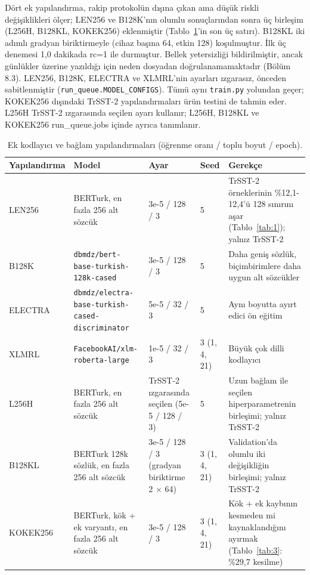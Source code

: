 \documentclass[11pt]{article}
\begin{document}
Dört ek yapılandırma, rakip protokolün dışına çıkan ama düşük riskli değişiklikleri ölçer; LEN256 ve B128K'nın olumlu sonuçlarından sonra üç birleşim (L256H, B128KL, KOKEK256) eklenmiştir (Tablo~\ref{tab:5}'in son üç satırı). B128KL iki adımlı gradyan biriktirmeyle (cihaz başına 64, etkin 128) koşulmuştur. İlk üç denemesi 1,0 dakikada rc=1 ile durmuştur. Bellek yetersizliği bildirilmiştir, ancak günlükler üzerine yazıldığı için neden dosyadan doğrulanamamaktadır (Bölüm 8.3). LEN256, B128K, ELECTRA ve XLMRL'nin ayarları ızgarasız, önceden sabitlenmiştir (\texttt{run\_\allowbreak{}\allowbreak{}queue.\allowbreak{}\allowbreak{}MODEL\_\allowbreak{}\allowbreak{}CONFIGS}). Tümü aynı \texttt{train.\allowbreak{}\allowbreak{}py} yolundan geçer; KOKEK256 dışındaki TrSST-2 yapılandırmaları ürün testini de tahmin eder. L256H TrSST-2 ızgarasında seçilen ayarı kullanır; L256H, B128KL ve KOKEK256 run\_\allowbreak{}queue.jobs içinde ayrıca tanımlanır.

\begin{table}[!htbp]
\centering
\footnotesize
\setlength{\tabcolsep}{3pt}
\begin{tabularx}{\textwidth}{l>{\raggedright\arraybackslash}X>{\raggedright\arraybackslash}Xl>{\raggedright\arraybackslash}X}
\toprule
Yapılandırma & Model & Ayar & Seed & Gerekçe \\
\midrule
LEN256 & BERTurk, en fazla 256 alt sözcük & 3e-5 / 128 / 3 & 5 & TrSST-2 örneklerinin \%12,1-12,4'ü 128 sınırını aşar (Tablo~\ref{tab:1}); yalnız TrSST-2 \\
B128K & \texttt{dbmdz/\allowbreak{}\allowbreak{}bert-{}\allowbreak{}base-{}\allowbreak{}turkish-{}\allowbreak{}128k-{}\allowbreak{}cased} & 3e-5 / 128 / 3 & 5 & Daha geniş sözlük, biçimbirimlere daha uygun alt sözcükler \citep{toraman2023} \\
ELECTRA & \texttt{dbmdz/\allowbreak{}\allowbreak{}electra-{}\allowbreak{}base-{}\allowbreak{}turkish-{}\allowbreak{}cased-{}\allowbreak{}discriminator} & 5e-5 / 32 / 3 & 5 & Aynı boyutta ayırt edici ön eğitim \citep{clark2020} \\
XLMRL & \texttt{FacebookAI/\allowbreak{}\allowbreak{}xlm-{}\allowbreak{}roberta-{}\allowbreak{}large} & 1e-5 / 32 / 3 & 3 (1, 4, 21) & Büyük çok dilli kodlayıcı \citep{conneau2020} \\
L256H & BERTurk, en fazla 256 alt sözcük & TrSST-2 ızgarasında seçilen (5e-5 / 128 / 3) & 5 & Uzun bağlam ile seçilen hiperparametrenin birleşimi; yalnız TrSST-2 \\
B128KL & BERTurk 128k sözlük, en fazla 256 alt sözcük & 3e-5 / 128 / 3 (gradyan biriktirme 2 $\times$ 64) & 3 (1, 4, 21) & Validation'da olumlu iki değişikliğin birleşimi; yalnız TrSST-2 \\
KOKEK256 & BERTurk, kök + ek varyantı, en fazla 256 alt sözcük & 3e-5 / 128 / 3 & 3 (1, 4, 21) & Kök + ek kaybının kesmeden mi kaynaklandığını ayırmak (Tablo~\ref{tab:3}: \%29,7 kesilme) \\
\bottomrule
\end{tabularx}
\caption{Ek kodlayıcı ve bağlam yapılandırmaları (öğrenme oranı / toplu boyut / epoch).}
\label{tab:5}
\end{table}
\end{document}
